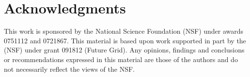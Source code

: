 \documentclass[conference]{IEEEtran}
\begin{document}
\section*{Acknowledgments}

This work is sponsored by the National Science Foundation (NSF) under awards
0751112 and 0721867.  This material is based upon work supported in part by the
(NSF) under grant 091812 (Future Grid).  Any opinions, findings and conclusions
or recommendations expressed in this material are those of the authors and do
not necessarily reflect the views of the NSF.



\end{document}
